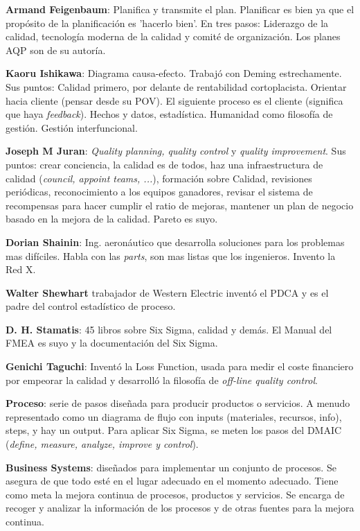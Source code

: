 \documentclass[]{article}
\begin{document}
\textbf{Armand Feigenbaum}: Planifica y transmite el plan. Planificar es bien ya que el propósito de la planificación es 'hacerlo bien'. En tres pasos: Liderazgo de la calidad, tecnología moderna de la calidad y comité de organización. Los planes AQP son de su autoría. 

\textbf{Kaoru Ishikawa}: Diagrama causa-efecto. Trabajó con Deming estrechamente. Sus puntos: Calidad primero, por delante de rentabilidad cortoplacista. Orientar hacia cliente (pensar desde su POV). El siguiente proceso es el cliente (significa que haya \textit{feedback}). Hechos y datos, estadística. Humanidad como filosofía de gestión. Gestión interfuncional. 

\textbf{Joseph M Juran}: \textit{Quality planning, quality control} y \textit{quality improvement}. Sus puntos: crear conciencia, la calidad es de todos, haz una infraestructura de calidad (\textit{council, appoint teams, ...}), formación sobre Calidad, revisiones periódicas, reconocimiento a los equipos ganadores, revisar el sistema de recompensas para hacer cumplir el ratio de mejoras, mantener un plan de negocio basado en la mejora de la calidad. Pareto es suyo. 

\textbf{Dorian Shainin}: Ing. aeronáutico que desarrolla soluciones para los problemas mas difíciles. Habla con las \textit{parts}, son mas listas que los ingenieros. Invento la Red X.

\textbf{Walter Shewhart} trabajador de Western Electric inventó el PDCA y es el padre del control estadístico de proceso. 

\textbf{D. H. Stamatis}: 45 libros sobre Six Sigma, calidad y demás. El Manual del FMEA es suyo y la documentación del Six Sigma.

\textbf{Genichi Taguchi}: Inventó la Loss Function, usada para medir el coste financiero por empeorar la calidad y desarrolló la filosofía de \textit{off-line quality control}. 

\textbf{Proceso}: serie de pasos diseñada para producir productos o servicios. A menudo representado como un diagrama de flujo con inputs (materiales, recursos, info), steps, y hay un output. Para aplicar Six Sigma, se meten los pasos del DMAIC (\textit{define, measure, analyze, improve y control}). 

\textbf{Business Systems}: diseñados para implementar un conjunto de procesos. Se asegura de que todo esté en el lugar adecuado en el momento adecuado. Tiene como meta la mejora continua de procesos, productos y servicios. Se encarga de recoger y analizar la información de los procesos y de otras fuentes para la mejora continua.  
\end{document}

